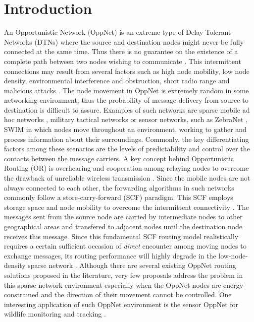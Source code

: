 \documentclass[conference]{IEEEtran}
\begin{document}
\section{Introduction}
An Opportunistic Network (OppNet) is an extreme type of Delay Tolerant Networks (DTNs) where the source and destination nodes might never be fully connected at the same time.
Thus there is no guarantee on the existence of a complete path between two nodes wishing to communicate \cite{MWNsBook2011}.
This intermittent connections may result from several factors such as high node mobility, low node density, environmental interference and obstruction, short radio range and malicious attacks \cite{prodhan2011}.
The node movement in OppNet is extremely random in some networking environment, thus the probability of message delivery from source to destination is difficult to assure.
Examples of such networks are sparse mobile ad hoc networks \cite{Alekeish2012}, military tactical networks \cite{Scott2005,Kerdsri2013} or sensor networks, such as ZebraNet \cite{zebranet2004}, SWIM \cite{Small2003}  in which nodes move throughout an environment, working to gather and process information about their surroundings.
Commonly, the key differentiating factors among these scenarios are the levels of predictability and control over the contacts between the message carriers\cite{Karkkainen2013}.
A key concept behind Opportunistic Routing (OR) is overhearing and cooperation among relaying nodes to overcome the drawback of unreliable wireless transmission \cite{Liu2009}.
Since the mobile nodes are not always connected to each other, the forwarding algorithms in such networks commonly follow a store-carry-forward (SCF) paradigm.
This SCF employs storage space and node mobility to overcome the intermittent connectivity \cite{Ma2011}.
The messages sent from the source node are carried by intermediate nodes to other geographical areas and transfered to adjacent nodes until the destination node receives this message.
Since this fundamental SCF routing model realistically requires a certain sufficient occasion of \emph{direct} encounter among moving nodes to exchange messages, its routing performance will highly degrade in the low-node-density sparse network \cite{Spyropoulos2010}.
Although there are several existing OppNet routing solutions \cite{ Zhang2013, Chung-Ming2008, Spyropoulos2004, Grossglauser2002, Vahdat2000,Kerdsri2013} proposed in the literature, very few proposals address the problem in this sparse network environment especially when the OppNet nodes are energy-constrained \cite{Liguang2013,Eu2010} and the direction of their movement cannot be controlled.
One interesting application of such OppNet environment is the sensor OppNet for wildlife monitoring and tracking \cite{zebranet2004, Small2003}.
\end{document}
